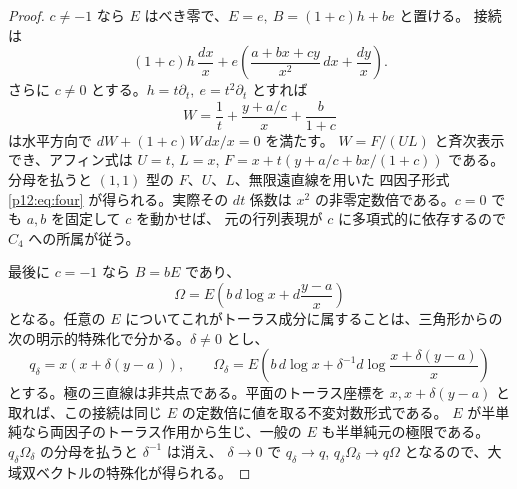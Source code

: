 \begin{proof}
$c\ne-1$ なら $E$ はべき零で、$E=e,\ B=(1+c)h+b e$ と置ける。
接続は
\[
 (1+c)h\,\frac{dx}{x}+
 e\left(\frac{a+bx+cy}{x^2}\,dx+\frac{dy}{x}\right).
\]
さらに $c\ne0$ とする。$h=t\partial_t,\ e=t^2\partial_t$ とすれば
\[
 W=\frac1t+\frac{y+a/c}{x}+\frac{b}{1+c}
\]
は水平方向で $dW+(1+c)W\,dx/x=0$ を満たす。
$W=F/(U L)$ と斉次表示でき、アフィン式は $U=t$, $L=x$,
$F=x+t(y+a/c+bx/(1+c))$ である。
分母を払うと $(1,1)$ 型の $F$、$U$、$L$、無限遠直線を用いた
四因子形式 \eqref{p12:eq:four} が得られる。実際その $dt$ 係数は
$x^2$ の非零定数倍である。$c=0$ でも $a,b$ を固定して $c$ を動かせば、
元の行列表現が $c$ に多項式的に依存するので $C_4$ への所属が従う。

最後に $c=-1$ なら $B=bE$ であり、
\[
 \Omega=E\left(b\,d\log x+d\frac{y-a}{x}\right)
\]
となる。任意の $E$ についてこれがトーラス成分に属することは、三角形からの
次の明示的特殊化で分かる。$\delta\ne0$ とし、
\[
 q_\delta=x(x+\delta(y-a)),\qquad
 \Omega_\delta=E\left(b\,d\log x+
 \delta^{-1}d\log\frac{x+\delta(y-a)}{x}\right)
\]
とする。極の三直線は非共点である。平面のトーラス座標を $x,x+\delta(y-a)$
と取れば、この接続は同じ $E$ の定数倍に値を取る不変対数形式である。
$E$ が半単純なら両因子のトーラス作用から生じ、一般の $E$ も半単純元の極限である。
$q_\delta\Omega_\delta$ の分母を払うと $\delta^{-1}$ は消え、
$\delta\to0$ で $q_\delta\to q$, $q_\delta\Omega_\delta\to q\Omega$
となるので、大域双ベクトルの特殊化が得られる。
\end{proof}

